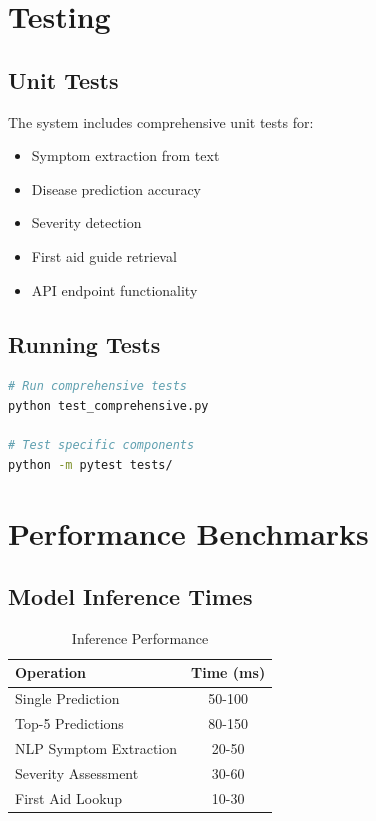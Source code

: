 \section{Testing}
\subsection{Unit Tests}
The system includes comprehensive unit tests for:
\begin{itemize}
    \item Symptom extraction from text
    \item Disease prediction accuracy
    \item Severity detection
    \item First aid guide retrieval
    \item API endpoint functionality
\end{itemize}

\subsection{Running Tests}
\begin{lstlisting}[language=bash, caption=Test Execution]
# Run comprehensive tests
python test_comprehensive.py

# Test specific components
python -m pytest tests/
\end{lstlisting}

\section{Performance Benchmarks}
\subsection{Model Inference Times}
\begin{table}[H]
\centering
\caption{Inference Performance}
\begin{tabular}{|l|c|}
\hline
\textbf{Operation} & \textbf{Time (ms)} \\
\hline
Single Prediction & 50-100 \\
\hline
Top-5 Predictions & 80-150 \\
\hline
NLP Symptom Extraction & 20-50 \\
\hline
Severity Assessment & 30-60 \\
\hline
First Aid Lookup & 10-30 \\
\hline
\end{tabular}
\end{table}

